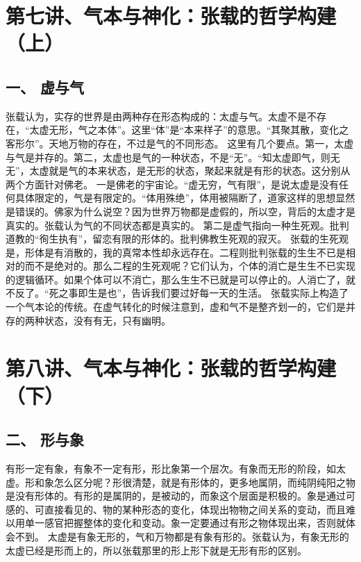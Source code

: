 \documentclass{article}
\begin{document}
\section{第七讲、气本与神化：张载的哲学构建（上）}
\subsection{一、	虚与气}
张载认为，实存的世界是由两种存在形态构成的：太虚与气。太虚不是不存在，“太虚无形，气之本体”。这里“体”是“本来样子”的意思。“其聚其散，变化之客形尔”。天地万物的存在，不过是气的不同形态。
这里有几个要点。第一，太虚与气是并存的。第二，太虚也是气的一种状态，不是“无”。“知太虚即气，则无无”，太虚就是气的本来状态，是无形的状态，聚起来就是有形的状态。这分别从两个方面针对佛老。
一是佛老的宇宙论。“虚无穷，气有限”，是说太虚是没有任何具体限定的，气是有限定的。“体用殊绝”，体用被隔断了，道家这样的思想显然是错误的。佛家为什么说空？因为世界万物都是虚假的，所以空，背后的太虚才是真实的。张载认为气的不同状态都是真实的。
第二是虚气指向一种生死观。批判道教的“徇生执有”，留恋有限的形体的。批判佛教生死观的寂灭。
张载的生死观是，形体是有消散的，我的真常本性却永远存在。二程则批判张载的生生不已是相对的而不是绝对的。那么二程的生死观呢？它们认为，个体的消亡是生生不已实现的逻辑循环。如果个体可以不消亡，那么生生不已就是可以停止的。人消亡了，就不反了。“死之事即生是也”，告诉我们要过好每一天的生活。
张载实际上构造了一个气本论的传统。在虚气转化的时候注意到，虚和气不是整齐划一的，它们是并存的两种状态，没有有无，只有幽明。

\section{第八讲、气本与神化：张载的哲学构建（下）}
\subsection{二、	形与象}
有形一定有象，有象不一定有形，形比象第一个层次。有象而无形的阶段，如太虚。形和象怎么区分呢？形很清楚，就是有形体的，更多地属阴，而纯阴纯阳之物是没有形体的。有形的是属阴的，是被动的，而象这个层面是积极的。象是通过可感的、可直接看见的、物的某种形态的变化，体现出物物之间关系的变动，而且难以用单一感官把握整体的变化和变动。象一定要通过有形之物体现出来，否则就体会不到。
太虚是有象无形的，气和万物都是有象有形的。张载认为，有象无形的太虚已经是形而上的，所以张载那里的形上形下就是无形有形的区别。
\end{document}
